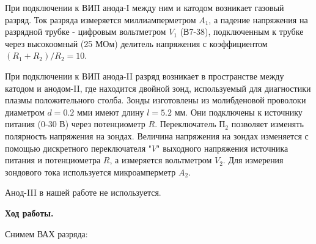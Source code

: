 \documentclass[14pt]{article}
\begin{document}
При подключении к ВИП анода-I между ним и катодом возникает газовый разряд. Ток разряда измеряется миллиамперметром $A_1$, а падение напряжения на разрядной трубке - цифровым вольтметром $V_1$ (В7-38), подключенным к трубке через высокоомный (25 МОм) делитель напряжения с коэффициентом $(R_1 + R_2)/R_2 = 10$.

При подключении к ВИП анода-II разряд возникает в пространстве между катодом и анодом-II, где находится двойной зонд, используемый для диагностики плазмы положительного столба. Зонды изготовлены из молибденовой проволоки диаметром $d = 0.2$ мми имеют длину $l = 5.2$ мм. Они подключены к источнику питания (0-30 В) через потенциометр $R$. Переключатель П$_2$ позволяет изменять полярность напряжения на зондах. Величина напряжения на зондах изменяется с помощью дискретного переключателя "$V$" выходного напряжения источника питания и потенциометра $R$, а измеряется вольтметром $V_2$. Для измерения зондового тока используется микроамперметр $A_2$. 

Анод-III в нашей работе не используется. 

\newpage

\textbf{Ход работы.}

Снимем ВАХ разряда:
\end{document}
